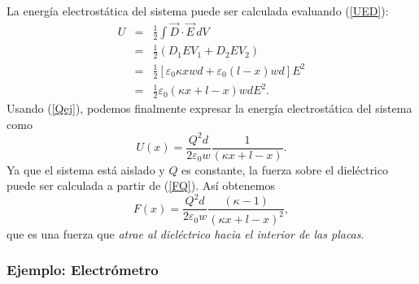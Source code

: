 La energía electrostática del sistema puede ser calculada evaluando
(\ref{UED}):
\begin{eqnarray}
 U&=&\frac{1}{2}\int\vec{D}\cdot\vec{E}\,dV \\
&=&\frac{1}{2}\left(D_1EV_1+D_2EV_2\right) \\
&=&\frac{1}{2}\left[\varepsilon_0\kappa
xwd+\varepsilon_0(l-x)wd\right]E^2 \\
&=&\frac{1}{2}\varepsilon_0\left(\kappa x+l-x\right)wdE^2 .
\end{eqnarray}
Usando (\ref{Qej}), podemos finalmente expresar la energía electrostática
del sistema como
\begin{equation}
U(x)=\frac{Q^2d}{2\varepsilon_0 w}\frac{1}{(\kappa x+l-x)}.
\end{equation}
Ya que el sistema está aislado y $Q$ es constante, la fuerza sobre el
dieléctrico puede ser calculada a partir de (\ref{FQ}). Así obtenemos
\begin{equation}
 F(x)=\frac{Q^2d}{2\varepsilon_0 w}\frac{(\kappa-1)}{(\kappa x+l-x)^2},
\end{equation}
que es una fuerza que \textit{atrae al dieléctrico hacia el interior de las
placas}.

\subsubsection{Ejemplo: Electrómetro}